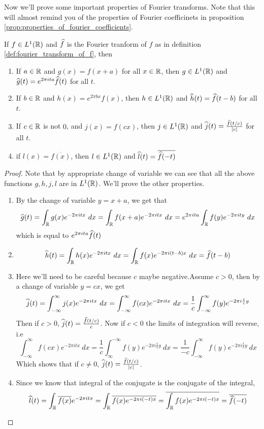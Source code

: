   Now we'll prove some important properties of Fourier transforms. Note that this will almost remind you of the properties of Fourier coefficinets in proposition \ref{prop:properties_of_fourier_coefficients}. 
  \begin{proposition}
    \label{prop:properties_of_fourier_transform}
    If $f\in L^1(\mathbb R)$ and $\widehat{f}$ is the Fourier tranform of $f$ as in definition \ref{def:fourier_transform_of_f}, then 
    \begin{enumerate}[label=(\alph*)]
      \item If $a \in \mathbb R$ and $g(x) = f(x+a)$ for all $x \in \mathbb R$, then $g \in L^1(\mathbb R)$ and $\widehat{g}(t) = e^{2\pi ita} \widehat{f}(t)$ for all $t$.
      \item If $b \in \mathbb R$ and $h(x) = e^{2\pi bx}f(x)$, then $h \in L^1(\mathbb R)$ and $\widehat{h}(t) = \widehat{f}(t-b)$ for all $t$.
      \item If $c \in \mathbb R$ is not $0$, and $j(x) = f(cx)$, then $j \in L^1(\mathbb R)$ and $\widehat{j}(t) = \frac{\widehat{f}(t/c)}{|c|}$ for all $t$.
      \item if $l(x) = \overline{f(x)}$, then $l\in L^1(\mathbb R)$ and $\widehat{l}(t) = \overline{\widehat{f}(-t)}$
    \end{enumerate}
  \end{proposition}

  \begin{proof}
    Note that by appropriate change of variable we can see that all the above functions $g, h, j, l$ are in $L^1(\mathbb R)$. We'll prove the other properties.
    \begin{enumerate}[label=(\alph*)]
      \item By the change of variable $y = x+a$, we get that
        $$\widehat{g}(t) = \int_{\mathbb R}g(x)e^{-2 \pi itx} \ dx = \int_\mathbb R f(x+a)e^{-2\pi itx} \ dx = e^{2\pi ita}\int_\mathbb R f(y)e^{-2 \pi ity} \ dx$$
        which is equal to $e^{2\pi ita}\widehat{f}(t)$

      \item $$\widehat{h}(t) = \int_{\mathbb R}h(x)e^{-2\pi itx} \ dx = \int_\mathbb R f(x)e^{-2\pi i(t-b)x} \ dx = \widehat{f}(t-b)$$

      \item Here we'll need to be careful because $c$ maybe negative.Assume $c>0$, then by a change of variable $y=cx$, we get $$\widehat{j}(t) = \int_{-\infty}^{\infty} j(x)e^{-2\pi itx} \ dx = \int_{-\infty}^{\infty} f(cx)e^{-2\pi itx} \ dx = \frac{1}{c}\int_{-\infty}^{\infty} f(y)e^{-2\pi i \frac{t}{c}y} $$
        Then if $c>0$, $\widehat{j}(t) = \frac{\widehat{f}(t/c)}{c}$. Now if $c<0$ the limits of integration will reverse, i.e $$\int_{-\infty}^{\infty} f(cx)e^{-2\pi itx} \ dx = \frac{1}{c}\int_{\infty}^{-\infty} f(y)e^{-2\pi i \frac{t}{c}y} \ dx = \frac{1}{-c}\int_{-\infty}^{\infty} f(y)e^{-2\pi i \frac{t}{c}y} \ dx$$
        Which shows that if $c\neq 0$, $\widehat{j}(t) = \frac{\widehat{f}(t/c)}{|c|}$.
      \item Since we know that integral of the conjugate is the conjugate of the integral, $$\widehat{l}(t) = \int_\mathbb R \overline{f(x)} e^{-2\pi itx} = \int_\mathbb R \overline{f(x) e^{-2\pi i(-t)x}} = \overline{\int_\mathbb R f(x) e^{-2\pi i(-t)x}} = \overline{\widehat{f}(-t)}$$
    \end{enumerate}
  \end{proof}



